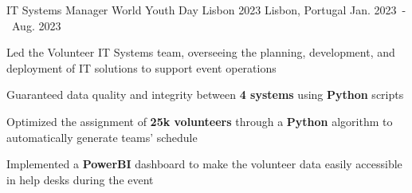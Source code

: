 \begin{cventries}
\cventry
  {IT Systems Manager} %
  {World Youth Day Lisbon 2023} %
  {Lisbon, Portugal} %
  {Jan. 2023~-~Aug. 2023} %
  {
    \begin{cvitems}
      \item {Led the Volunteer IT Systems team, overseeing the planning, development, and deployment of IT solutions to support event operations}
      \item {Guaranteed data quality and integrity between \textbf{4 systems} using \textbf{Python} scripts}
      \item {Optimized the assignment of \textbf{25k volunteers} through a \textbf{Python} algorithm to automatically generate teams' schedule}
      \item {Implemented a \textbf{PowerBI} dashboard to make the volunteer data easily accessible in help desks during the event}
    \end{cvitems}
  }
  

  

\end{cventries}
